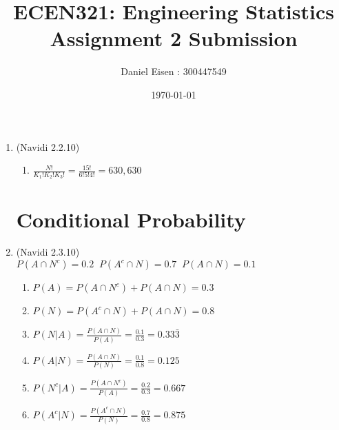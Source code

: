 \documentclass[11pt]{article}
\title{ECEN321: Engineering Statistics \\ Assignment 2 Submission}
\author{Daniel Eisen : 300447549}
\date{\today}
\begin{document}
\maketitle
\begin{enumerate}
\section*{Counting Methods}
        \item (Navidi 2.2.10) %
        \begin{enumerate}
                \item[] $\frac{N!}{K_{1}!K_{2}!K_{3}!} = \frac{15!}{6!5!4!} = 630,630$
        \end{enumerate}

\section*{Conditional Probability}
        \item (Navidi 2.3.10) \\ %
        $P(A \cap N^{c}) = 0.2 \;\; P(A^{c} \cap N) = 0.7 \;\; P(A \cap N) = 0.1$
        \begin{enumerate}
                \item %
                $P(A) = P(A \cap N^{c}) + P(A \cap N) = 0.3$
                \item %
                $P(N) = P(A^{c} \cap N) + P(A \cap N) = 0.8$
                \item %
                $P(N|A) = \frac{P(A \cap N)}{P(A)} = \frac{0.1}{0.3} = 0.33\bar{3}$
                \item %
                $P(A|N) = \frac{P(A \cap N)}{P(N)} = \frac{0.1}{0.8} = 0.125$
                \item %
                $P(N^{c}|A) = \frac{P(A \cap N^{c})}{P(A)} = \frac{0.2}{0.3} = 0.667$
                \item %
                $P(A^{c}|N) = \frac{P(A^{c} \cap N)}{P(N)} = \frac{0.7}{0.8} = 0.875$
        \end{enumerate}


\end{enumerate}
\end{document}
